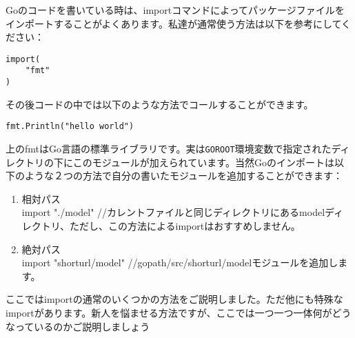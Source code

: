 Goのコードを書いている時は、importコマンドによってパッケージファイルをインポートすることがよくあります。私達が通常使う方法は以下を参考にしてください：


\begin{lstlisting}[numbers=none]
import(
    "fmt"
)
\end{lstlisting}

その後コードの中では以下のような方法でコールすることができます。

\begin{lstlisting}[numbers=none]
fmt.Println("hello world")
\end{lstlisting}

上のfmtはGo言語の標準ライブラリです。実は\texttt{GOROOT}環境変数で指定されたディレクトリの下にこのモジュールが加えられています。当然Goのインポートは以下のような２つの方法で自分の書いたモジュールを追加することができます：

\begin{enumerate}
  \item 相対パス\\ import "./model" //カレントファイルと同じディレクトリにあるmodelディレクトリ、ただし、この方法によるimportはおすすめしません。
  \item 絶対パス\\ import "shorturl/model" //gopath/src/shorturl/modelモジュールを追加します。
\end{enumerate}

ここではimportの通常のいくつかの方法をご説明しました。ただ他にも特殊なimportがあります。新人を悩ませる方法ですが、ここでは一つ一つ一体何がどうなっているのかご説明しましょう

